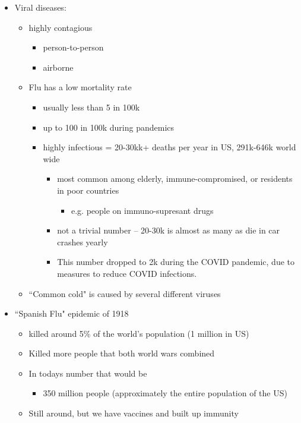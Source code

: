 \documentclass{article}
\theoremstyle{definition}
\begin{document}
\begin{itemize}
	\item Viral diseases:
		\begin{itemize}
			\item highly contagious
				\begin{itemize}
					\item person-to-person
					\item airborne
				\end{itemize}
			\item Flu has a low mortality rate
				\begin{itemize}
					\item usually less than 5 in 100k
					\item up to 100 in 100k during pandemics
					\item highly infectious = 20-30kk+ deaths per year in US, 291k-646k world wide
						\begin{itemize}
							\item most common among elderly, immune-compromised, or residents in poor countries
								\begin{itemize}
									\item e.g. people on immuno-supresant drugs
								\end{itemize}
							\item not a trivial number -- 20-30k is almost as many as die in car crashes yearly
							\item This number dropped to 2k during the COVID pandemic, due to measures to reduce COVID infections.
						\end{itemize}
				\end{itemize}
			\item ``Common cold" is caused by several different viruses
		\end{itemize}
	\item ``Spanish Flu" epidemic of 1918
		\begin{itemize}
			\item killed around 5\% of the world's population (1 million in US)
			\item Killed more people that both world wars combined
			\item In todays number that would be
				\begin{itemize}
					\item 350 million people (approximately the entire population of the US)
				\end{itemize}
			\item Still around, but we have vaccines and built up immunity

\end{itemize}
\end{itemize}
\end{document}
